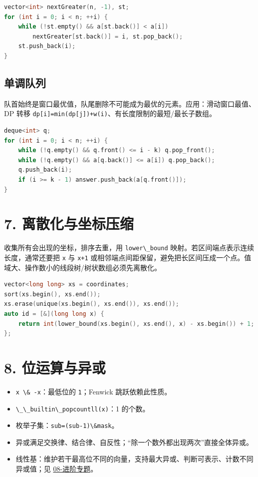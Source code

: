 \begin{lstlisting}[language={C++}]
vector<int> nextGreater(n, -1), st;
for (int i = 0; i < n; ++i) {
    while (!st.empty() && a[st.back()] < a[i])
        nextGreater[st.back()] = i, st.pop_back();
    st.push_back(i);
}
\end{lstlisting}

\subsection{单调队列}\label{ux5355ux8c03ux961fux5217}

队首始终是窗口最优值，队尾删除不可能成为最优的元素。应用：滑动窗口最值、DP 转移 \passthrough{\lstinline!dp[i]=min(dp[j])+w(i)!}、有长度限制的最短/最长子数组。

\begin{lstlisting}[language={C++}]
deque<int> q;
for (int i = 0; i < n; ++i) {
    while (!q.empty() && q.front() <= i - k) q.pop_front();
    while (!q.empty() && a[q.back()] <= a[i]) q.pop_back();
    q.push_back(i);
    if (i >= k - 1) answer.push_back(a[q.front()]);
}
\end{lstlisting}

\section{7. 离散化与坐标压缩}\label{ux79bbux6563ux5316ux4e0eux5750ux6807ux538bux7f29}

收集所有会出现的坐标，排序去重，用 \passthrough{\lstinline!lower\_bound!} 映射。若区间端点表示连续长度，通常还要把 \passthrough{\lstinline!x!} 与 \passthrough{\lstinline!x+1!} 或相邻端点间距保留，避免把长区间压成一个点。值域大、操作数小的线段树/树状数组必须先离散化。

\begin{lstlisting}[language={C++}]
vector<long long> xs = coordinates;
sort(xs.begin(), xs.end());
xs.erase(unique(xs.begin(), xs.end()), xs.end());
auto id = [&](long long x) {
    return int(lower_bound(xs.begin(), xs.end(), x) - xs.begin()) + 1;
};
\end{lstlisting}

\section{8. 位运算与异或}\label{ux4f4dux8fd0ux7b97ux4e0eux5f02ux6216}

\begin{itemize}
\tightlist
\item
  \passthrough{\lstinline!x \& -x!}：最低位的 \passthrough{\lstinline!1!}；Fenwick 跳跃依赖此性质。
\item
  \passthrough{\lstinline!\_\_builtin\_popcountll(x)!}：1 的个数。
\item
  枚举子集：\passthrough{\lstinline!sub=(sub-1)\&mask!}。
\item
  异或满足交换律、结合律、自反性；``除一个数外都出现两次''直接全体异或。
\item
  线性基：维护若干最高位不同的向量，支持最大异或、判断可表示、计数不同异或值；见 \href{08-进阶专题.md}{08-进阶专题}。
\end{itemize}

